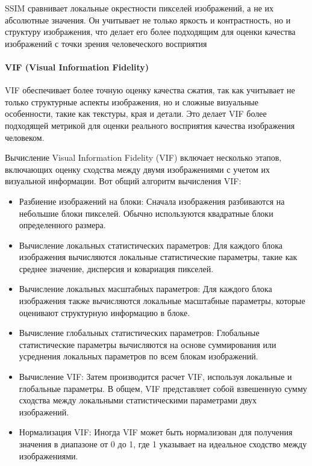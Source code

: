 
SSIM сравнивает локальные окрестности пикселей изображений, а не их абсолютные
значения. Он учитывает не только яркость и контрастность, но и структуру
изображения, что делает его более подходящим для оценки качества изображений с
точки зрения человеческого восприятия


\paragraph{VIF (Visual Information Fidelity)}

VIF обеспечивает более точную оценку качества сжатия, так как учитывает не
только структурные аспекты изображения, но и сложные визуальные особенности,
такие как текстуры, края и детали. Это делает VIF более подходящей метрикой для
оценки реального восприятия качества изображения человеком.


Вычисление Visual Information Fidelity (VIF) включает несколько этапов,
включающих оценку сходства между двумя изображениями с учетом их визуальной
информации. Вот общий алгоритм вычисления VIF:

\begin{itemize}
    \item Разбиение изображений на блоки: Сначала изображения разбиваются на
    небольшие блоки пикселей. Обычно используются квадратные блоки определенного
    размера.
    \item Вычисление локальных статистических параметров: Для каждого блока
    изображения вычисляются локальные статистические параметры, такие как
    среднее значение, дисперсия и ковариация пикселей.
    \item Вычисление локальных масштабных параметров: Для каждого блока
    изображения также вычисляются локальные масштабные параметры, которые
    оценивают структурную информацию в блоке.
    \item Вычисление глобальных статистических параметров: Глобальные
    статистические параметры вычисляются на основе суммирования или усреднения
    локальных параметров по всем блокам изображений.
    \item Вычисление VIF: Затем производится расчет VIF, используя локальные
    и глобальные параметры. В общем, VIF представляет собой взвешенную сумму
    сходства между локальными статистическими параметрами двух изображений.
    \item Нормализация VIF: Иногда VIF может быть нормализован для получения
    значения в диапазоне от 0 до 1, где 1 указывает на идеальное сходство между
    изображениями.
\end{itemize}

